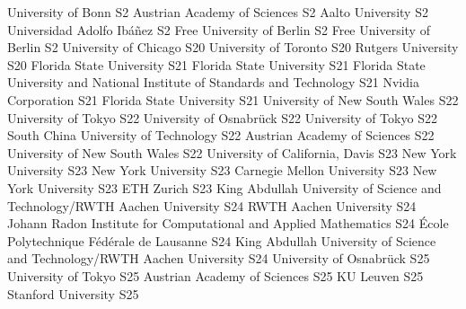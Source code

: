 \begin{multicols}{2}
{University of Bonn}
{S2}
{}
{Austrian Academy of Sciences}
{S2}
{}
{Aalto University}
{S2}
{}
{Universidad Adolfo Ibáñez}
{S2}
{}
{Free University of Berlin}
{S2}
{}
{Free University of Berlin}
{S2}
{}
{University of Chicago}
{S20}
{}
{University of Toronto}
{S20}
{}
{Rutgers University}
{S20}
{}
{Florida State University}
{S21}
{}
{Florida State University}
{S21}
{}
{Florida State University and National Institute of Standards and Technology}
{S21}
{}
{Nvidia Corporation}
{S21}
{}
{Florida State University}
{S21}
{}
{University of New South Wales}
{S22}
{}
{University of Tokyo}
{S22}
{}
{University of Osnabrück}
{S22}
{}
{University of Tokyo}
{S22}
{}
{South China University of Technology}
{S22}
{}
{Austrian Academy of Sciences}
{S22}
{}
{University of New South Wales}
{S22}
{}
{University of California, Davis}
{S23}
{}
{New York University}
{S23}
{}
{New York University}
{S23}
{}
{Carnegie Mellon University}
{S23}
{}
{New York University}
{S23}
{}
{ETH Zurich}
{S23}
{}
{King Abdullah University of Science and Technology/RWTH Aachen University}
{S24}
{}
{RWTH Aachen University}
{S24}
{}
{Johann Radon Institute for Computational and Applied Mathematics}
{S24}
{}
{École Polytechnique Fédérale de Lausanne}
{S24}
{}
{King Abdullah University of Science and Technology/RWTH Aachen University}
{S24}
{}
{University of Osnabrück}
{S25}
{}
{University of Tokyo}
{S25}
{}
{Austrian Academy of Sciences}
{S25}
{}
{KU Leuven}
{S25}
{}
{Stanford University}
{S25}
{}

\end{multicols}
